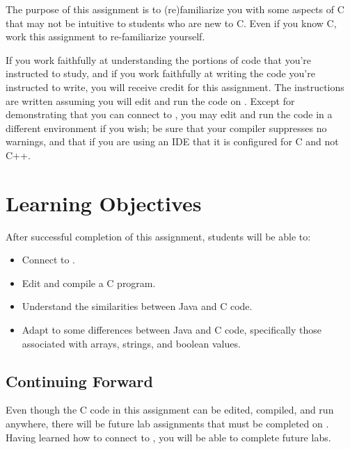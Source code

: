 


\renewcommand{\labnumber}{1}
\renewcommand{\labname}{C Programming Familiarization Lab}
\renewcommand{\shortlabname}{pokerlab}
\renewcommand{\collaborationrules}{Except as noted in Section~\ref{StudyTheCode}, \individualeffort}
\renewcommand{\duedate}{Week of January 24, before the start of your lab section}
\startdocument
% 

The purpose of this assignment is to (re)familiarize you with some aspects of C
that may not be intuitive to students who are new to C. Even if you know C,
work this assignment to re-familiarize yourself.

If you work faithfully at understanding the portions of code that you're
instructed to study, and if you work faithfully at writing the code you're
instructed to write, you will receive credit for this assignment. The
instructions are written assuming you will edit and run the code on
\runtimeenvironment. Except for demonstrating that you can connect to
\runtimeenvironment, you may edit and run the code in a different environment
if you wish; be sure that your compiler suppresses no warnings, and that if you
are using an IDE that it is configured for C and not C++.

\section*{Learning Objectives}

After successful completion of this assignment, students will be able to:
\begin{itemize}
\item Connect to \runtimeenvironment.
\item Edit and compile a C program.
\item Understand the similarities between Java and C code.
\item Adapt to some differences between Java and C code, specifically those
    associated with arrays, strings, and boolean values.
\end{itemize}

\subsection*{Continuing Forward}

Even though the C code in this assignment can be edited, compiled, and run
anywhere, there will be future lab assignments that must be completed on
\runtimeenvironment. Having learned how to connect to \runtimeenvironment, you
will be able to complete future labs.

